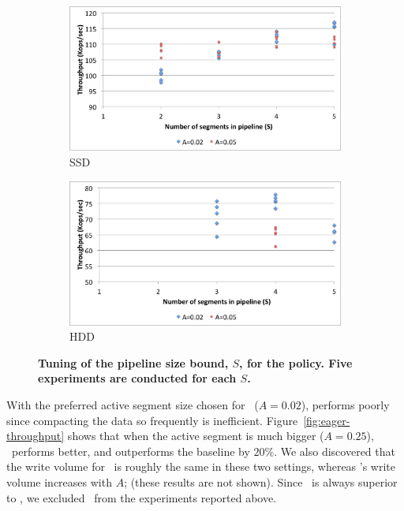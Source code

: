 \begin{figure}[tb]

  \centering
  
  \begin{subfigure}[t]{\columnwidth}
      \includegraphics[width=\figw]{Figs/pipeline-1-ssd.png}
      \caption[]{SSD}
    \label{fig:pipeline:ssd}  
  \end{subfigure}   
  \begin{subfigure}[t]{\columnwidth}
      \includegraphics[width=\figw]{Figs/pipeline-1-hdd.png}
      \caption[]{HDD}
    \label{fig:pipeline:hdd}
  \end{subfigure}

\caption{\textbf{Tuning of the pipeline size bound, $S$, for the \basic\/ policy. Five experiments are conducted for each $S$.} }
\label{fig:pipeline}
\end{figure}

With the preferred active segment size chosen for \basic\ ($A=0.02$), \eager\/ performs poorly since compacting the data so frequently is inefficient. 
Figure~\ref{fig:eager-throughput} shows that when the active segment is much bigger ($A=0.25$), \eager\ performs better, and outperforms the 
baseline by $20$\%. We also discovered that the write volume for \eager\ is roughly the same in these two settings, whereas \basic's write volume 
increases with $A$; (these results are not shown).  
Since \adp\ is always superior to \eager, we excluded \eager\ from the experiments reported above.  

